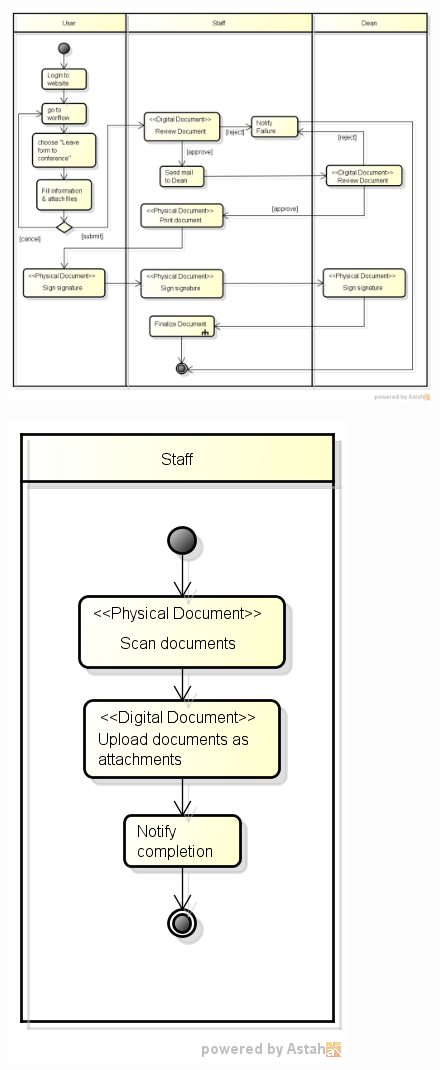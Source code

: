 \begin{figure}
	\includegraphics[scale=0.5]{res/Methodology/conference}
\end{figure}

\begin{figure}
	\includegraphics[scale=0.5]{res/Methodology/finalize_document}
\end{figure}


